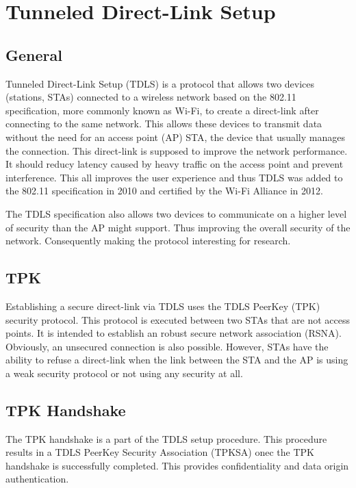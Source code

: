 \section{Tunneled Direct-Link Setup}\label{tdls}

\iffalse
- What is TDLS?
- Why TDLS?
- How does it work exactly?
\fi

\subsection{General}

Tunneled Direct-Link Setup (TDLS) is a protocol that allows two devices (stations, STAs) connected to a wireless network based on the 802.11 specification, more commonly known as Wi-Fi, to create a direct-link after connecting to the same network. This allows these devices to transmit data without the need for an access point (AP) STA, the device that usually manages the connection\cite{tdlspress}. This direct-link is supposed to improve the network performance. It should reducy latency caused by heavy traffic on the access point and prevent interference. This all improves the user experience and thus TDLS was added to the 802.11 specification in 2010 and certified by the Wi-Fi Alliance in 2012.

The TDLS specification also allows two devices to communicate on a higher level of security than the AP might support. Thus improving the overall security of the network. Consequently making the protocol interesting for research.

\subsection{TPK}

Establishing a secure direct-link via TDLS uses the TDLS PeerKey (TPK) security protocol. This protocol is executed between two STAs that are not access points. It is intended to establish an robust secure network association (RSNA). Obviously, an unsecured connection is also possible. However, STAs have the ability to refuse a direct-link when the link between the STA and the AP is using a weak security protocol or not using any security at all. 

\subsection{TPK Handshake}

The TPK handshake is a part of the TDLS setup procedure. This procedure results in a TDLS PeerKey Security Association (TPKSA) onec the TPK handshake is successfully completed. This provides confidentiality and data origin authentication.

